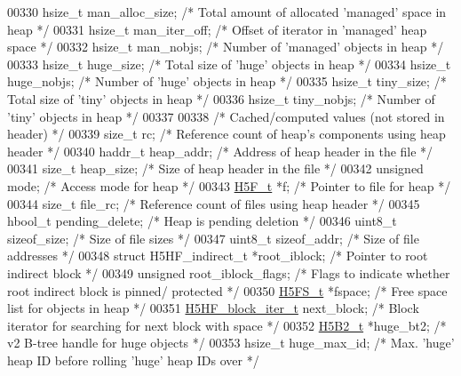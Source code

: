 \begin{DoxyCode}
00330     hsize\_t     man\_alloc\_size; \textcolor{comment}{/* Total amount of allocated 'managed' space in heap */}
00331     hsize\_t     man\_iter\_off;   \textcolor{comment}{/* Offset of iterator in 'managed' heap space */}
00332     hsize\_t     man\_nobjs;      \textcolor{comment}{/* Number of 'managed' objects in heap */}
00333     hsize\_t     huge\_size;      \textcolor{comment}{/* Total size of 'huge' objects in heap */}
00334     hsize\_t     huge\_nobjs;     \textcolor{comment}{/* Number of 'huge' objects in heap */}
00335     hsize\_t     tiny\_size;      \textcolor{comment}{/* Total size of 'tiny' objects in heap */}
00336     hsize\_t     tiny\_nobjs;     \textcolor{comment}{/* Number of 'tiny' objects in heap */}
00337 
00338     \textcolor{comment}{/* Cached/computed values (not stored in header) */}
00339     \textcolor{keywordtype}{size\_t}      rc;             \textcolor{comment}{/* Reference count of heap's components using heap header */}
00340     haddr\_t     heap\_addr;      \textcolor{comment}{/* Address of heap header in the file */}
00341     \textcolor{keywordtype}{size\_t}      heap\_size;      \textcolor{comment}{/* Size of heap header in the file */}
00342     \textcolor{keywordtype}{unsigned}    mode;           \textcolor{comment}{/* Access mode for heap */}
00343     \hyperlink{struct_h5_f__t}{H5F\_t}      *f;              \textcolor{comment}{/* Pointer to file for heap */}
00344     \textcolor{keywordtype}{size\_t}      file\_rc;        \textcolor{comment}{/* Reference count of files using heap header */}
00345     hbool\_t     pending\_delete; \textcolor{comment}{/* Heap is pending deletion */}
00346     uint8\_t     sizeof\_size;    \textcolor{comment}{/* Size of file sizes */}
00347     uint8\_t     sizeof\_addr;    \textcolor{comment}{/* Size of file addresses */}
00348     \textcolor{keyword}{struct }H5HF\_indirect\_t *root\_iblock;    \textcolor{comment}{/* Pointer to root indirect block */}
00349     \textcolor{keywordtype}{unsigned}    root\_iblock\_flags;      \textcolor{comment}{/* Flags to indicate whether root indirect block is pinned/
      protected */}
00350     \hyperlink{struct_h5_f_s__t}{H5FS\_t}      *fspace;        \textcolor{comment}{/* Free space list for objects in heap */}
00351     \hyperlink{struct_h5_h_f__block__iter__t}{H5HF\_block\_iter\_t} next\_block;   \textcolor{comment}{/* Block iterator for searching for next block with
       space */}
00352     \hyperlink{struct_h5_b2__t}{H5B2\_t}      *huge\_bt2;      \textcolor{comment}{/* v2 B-tree handle for huge objects */}
00353     hsize\_t     huge\_max\_id;    \textcolor{comment}{/* Max. 'huge' heap ID before rolling 'huge' heap IDs over */}

\end{DoxyCode}
